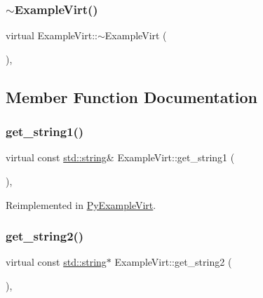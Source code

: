 \mbox{\label{class_example_virt_aae209e4a0a7f230d16ae3912b19a1b39}} 
\subsubsection{\texorpdfstring{$\sim$ExampleVirt()}{~ExampleVirt()}}
{\footnotesize\ttfamily virtual Example\+Virt\+::$\sim$\+Example\+Virt (\begin{DoxyParamCaption}{ }\end{DoxyParamCaption})\hspace{0.3cm}{\ttfamily [inline]}, {\ttfamily [virtual]}}



\subsection{Member Function Documentation}
\mbox{\label{class_example_virt_ab4f4498d072b7ca85eae10d0b504e8a0}} 
\subsubsection{\texorpdfstring{get\_string1()}{get\_string1()}}
{\footnotesize\ttfamily virtual const \mbox{\hyperlink{_s_d_l__opengl__glext_8h_ab4ccfaa8ab0e1afaae94dc96ef52dde1}{std\+::string}}\& Example\+Virt\+::get\+\_\+string1 (\begin{DoxyParamCaption}{ }\end{DoxyParamCaption})\hspace{0.3cm}{\ttfamily [inline]}, {\ttfamily [virtual]}}



Reimplemented in \mbox{\hyperlink{class_py_example_virt_ada5f3c9cf6cad9711d49d0edaca7af5c}{Py\+Example\+Virt}}.

\mbox{\label{class_example_virt_a21e6415d476fba511303b5dc897dfc83}} 
\subsubsection{\texorpdfstring{get\_string2()}{get\_string2()}}
{\footnotesize\ttfamily virtual const \mbox{\hyperlink{_s_d_l__opengl__glext_8h_ab4ccfaa8ab0e1afaae94dc96ef52dde1}{std\+::string}}$\ast$ Example\+Virt\+::get\+\_\+string2 (\begin{DoxyParamCaption}{ }\end{DoxyParamCaption})\hspace{0.3cm}{\ttfamily [inline]}, {\ttfamily [virtual]}}



